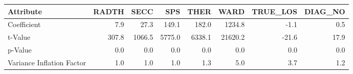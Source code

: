 \begin{tabular}{lrrrrrrr}
\toprule
Attribute &  RADTH &    SECC &     SPS &    THER &     WARD &  TRUE\_LOS &  DIAG\_NO \\
\midrule
Coefficient               &    7.9 &    27.3 &   149.1 &   182.0 &   1234.8 &      -1.1 &      0.5 \\
t-Value                   &  307.8 &  1066.5 &  5775.0 &  6338.1 &  21620.2 &     -21.6 &     17.9 \\
p-Value                   &    0.0 &     0.0 &     0.0 &     0.0 &      0.0 &       0.0 &      0.0 \\
Variance Inflation Factor &    1.0 &     1.0 &     1.0 &     1.3 &      5.0 &       3.7 &      1.2 \\
\bottomrule
\end{tabular}
